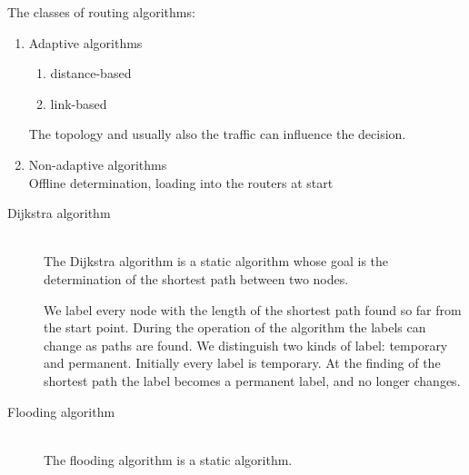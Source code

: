 \documentclass[margin=0px]{article}
\begin{document}
\begin{description}
        The classes of routing algorithms:
        \begin{enumerate}
            \item Adaptive algorithms
                  \begin{enumerate}
                      \item distance-based
                      \item link-based
                  \end{enumerate}
                  The topology and usually also the traffic can influence the decision.
            \item Non-adaptive algorithms \\
                  Offline determination, loading into the routers at start
        \end{enumerate}

        \begin{description}
            \item[Dijkstra algorithm] \hfill \\
                The Dijkstra algorithm is a static algorithm whose goal is the determination of the shortest path between two nodes.

                We label every node with the length of the shortest path found so far from the start point. During the operation of the algorithm the labels can change as paths are found. We distinguish two kinds of label: temporary and permanent. Initially every label is temporary. At the finding of the shortest path the label becomes a permanent label, and no longer changes.
            \item[Flooding algorithm] \hfill \\
                The flooding algorithm is a static algorithm.


\end{description}
\end{description}
\end{document}
